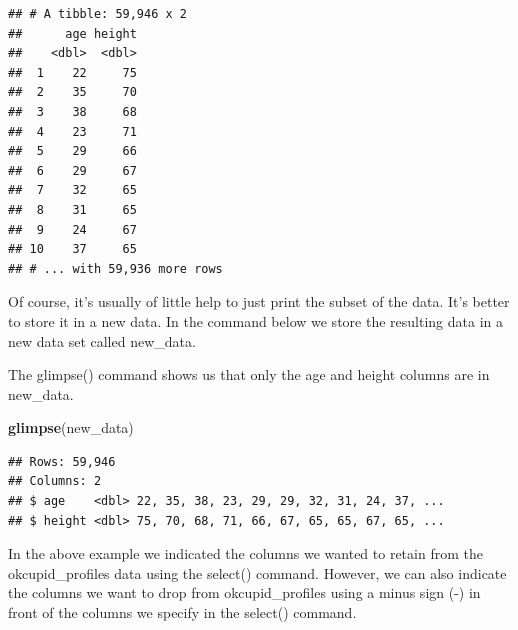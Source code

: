 \documentclass[
]{krantz}
\makeatletter
\newenvironment{Shaded}{\begin{snugshade}}{\end{snugshade}}
\newcommand{\KeywordTok}[1]{\textcolor[rgb]{0.27,0.27,0.27}{\textbf{#1}}}
\newcommand{\NormalTok}[1]{#1}
\newcommand{\OperatorTok}[1]{\textcolor[rgb]{0.43,0.43,0.43}{\textbf{#1}}}
\newcommand{\StringTok}[1]{\textcolor[rgb]{0.5,0.5,0.5}{#1}}
\newenvironment{kframe}{%
\medskip{}
\setlength{\fboxsep}{.8em}
 \def\at@end@of@kframe{}%
 \ifinner\ifhmode%
  \def\at@end@of@kframe{\end{minipage}}%
  \begin{minipage}{\columnwidth}%
 \fi\fi%
 \def\FrameCommand##1{\hskip\@totalleftmargin \hskip-\fboxsep
 \colorbox{shadecolor}{##1}\hskip-\fboxsep
     \hskip-\linewidth \hskip-\@totalleftmargin \hskip\columnwidth}%
 \MakeFramed {\advance\hsize-\width
   \@totalleftmargin\z@ \linewidth\hsize
   \@setminipage}}%
 {\par\unskip\endMakeFramed%
 \at@end@of@kframe}
\renewenvironment{Shaded}{\begin{kframe}}{\end{kframe}}
\makeatother
\begin{document}
\begin{verbatim}
## # A tibble: 59,946 x 2
##      age height
##    <dbl>  <dbl>
##  1    22     75
##  2    35     70
##  3    38     68
##  4    23     71
##  5    29     66
##  6    29     67
##  7    32     65
##  8    31     65
##  9    24     67
## 10    37     65
## # ... with 59,936 more rows
\end{verbatim}

Of course, it's usually of little help to just print the subset of the data. It's better to store it in a new data. In the command below we store the resulting data in a new data set called new\_data.

\begin{Shaded}
\end{Shaded}

The glimpse() command shows us that only the age and height columns are in new\_data.

\begin{Shaded}
\begin{Highlighting}[]
\KeywordTok{glimpse}\NormalTok{(new_data)}
\end{Highlighting}
\end{Shaded}

\begin{verbatim}
## Rows: 59,946
## Columns: 2
## $ age    <dbl> 22, 35, 38, 23, 29, 29, 32, 31, 24, 37, ...
## $ height <dbl> 75, 70, 68, 71, 66, 67, 65, 65, 67, 65, ...
\end{verbatim}

In the above example we indicated the columns we wanted to retain from the okcupid\_profiles data using the select() command. However, we can also indicate the columns we want to drop from okcupid\_profiles using a minus sign (-) in front of the columns we specify in the select() command.

\begin{Shaded}
\end{Shaded}
\end{document}
